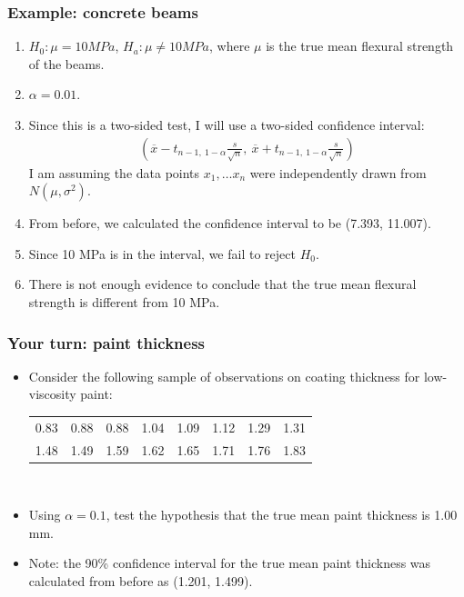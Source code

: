 \documentclass[handout]{beamer}\usepackage[]{graphicx}\usepackage[]{color}
\providecommand{\ov}[1]{\overline{#1}}
\providecommand{\q}{$\quad$ \newline}
\numberwithin{equation}{section}
\begin{document}
\begin{frame}
\frametitle{Example: concrete beams} \small
\begin{enumerate}[1. ]
\item $H_0: \mu = 10 MPa$, $H_a: \mu \ne 10 MPa$, where $\mu$ is the true mean flexural strength of the beams. 
\pause \item $\alpha = 0.01$.
\pause \item Since this is a two-sided test, I will use a two-sided confidence interval:
\pause \begin{align*}
\left (\ov{x} - t_{n - 1 , \ 1 - \alpha} \frac{s}{\sqrt{n}}, \ \ov{x} + t_{n - 1 , \ 1 - \alpha} \frac{s}{\sqrt{n}} \right )
\end{align*}
\pause I am assuming the data points $x_1, \ldots x_n$ were independently drawn from $N(\mu, \sigma^2)$.
\pause \item From before, we calculated the confidence interval to be (7.393, 11.007).
\pause \item Since 10 MPa is in the interval, we fail to reject $H_0$.
\pause \item There is not enough evidence to conclude that the true mean flexural strength is different from 10 MPa. 
\end{enumerate}
\end{frame}



\begin{frame}
\frametitle{Your turn: paint thickness}
\begin{itemize}
\item Consider the following sample of observations on coating thickness for low-viscosity paint: 
\pause \begin{tabular}{cccccccc}
0.83 & 0.88 & 0.88 & 1.04 & 1.09 & 1.12 & 1.29 & 1.31 \\
1.48 & 1.49 & 1.59 & 1.62 & 1.65 & 1.71 & 1.76 & 1.83
\end{tabular} \q
\pause \item Using $\alpha = 0.1$, test the hypothesis that the true mean paint thickness is 1.00 mm.
\pause \item Note: the 90\% confidence interval for the true mean paint thickness was calculated from before as  (1.201, 1.499).
\end{itemize}
\end{frame}
\end{document}
